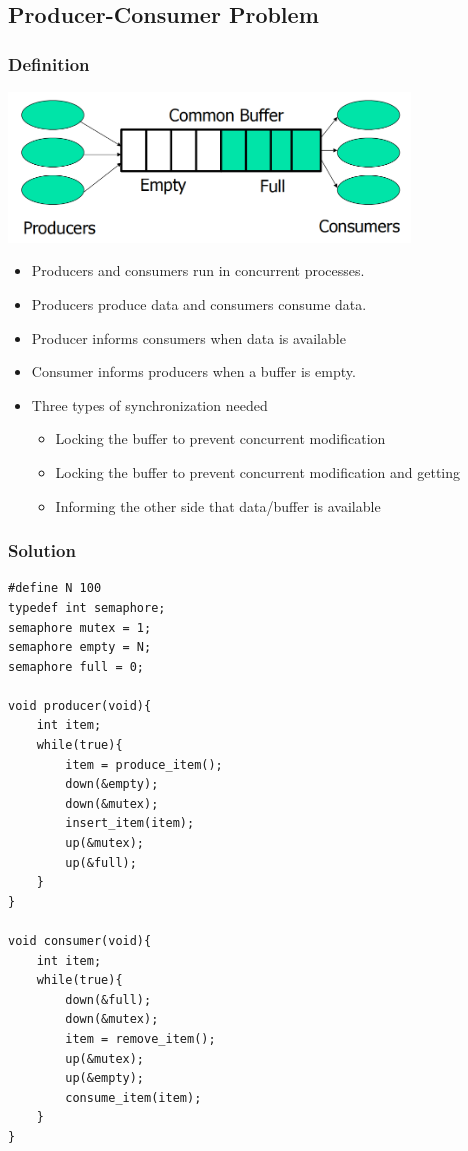 \documentclass[12pt]{article}
\begin{document}
\subsection{Producer-Consumer Problem}
\subsubsection{Definition}
\includegraphics[width=0.8\textwidth]{Producer-ConsumerProblem.png}
\begin{itemize}
    \item Producers and consumers run in concurrent processes.
    \item Producers produce data and consumers consume data.
    \item Producer informs consumers when data is available
    \item Consumer informs producers when a buffer is empty.
    \item Three types of synchronization needed \begin{itemize}
        \item Locking the buffer to prevent concurrent modification
        \item Locking the buffer to prevent concurrent modification and getting
        \item Informing the other side that data/buffer is available
    \end{itemize}
\end{itemize}
\subsubsection{Solution}
\begin{lstlisting}
#define N 100
typedef int semaphore;
semaphore mutex = 1;
semaphore empty = N;
semaphore full = 0;

void producer(void){
    int item;
    while(true){
        item = produce_item();
        down(&empty);
        down(&mutex);
        insert_item(item);
        up(&mutex);
        up(&full);
    }
}

void consumer(void){
    int item;
    while(true){
        down(&full);
        down(&mutex);
        item = remove_item();
        up(&mutex);
        up(&empty);
        consume_item(item);
    }
}
\end{lstlisting}
\end{document}
